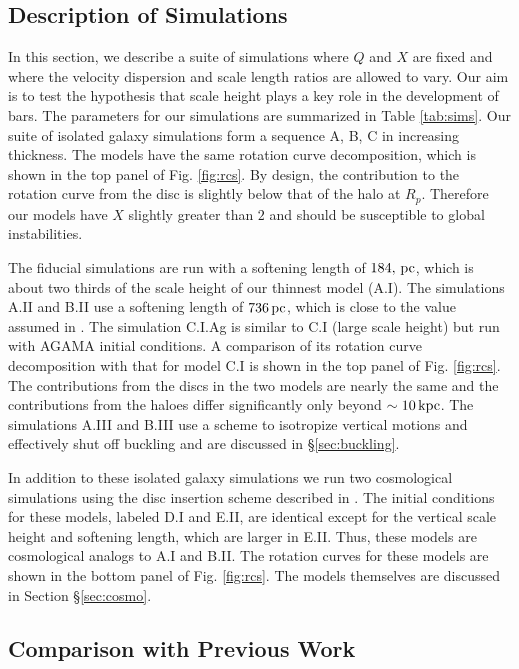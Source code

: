 \subsection{Description of Simulations}

In this section, we describe a suite of simulations where $Q$ and $X$
are fixed and where the velocity dispersion and scale length
ratios are allowed to vary.  Our aim is to test the hypothesis that scale
height plays a key role in the development of bars.  The parameters
for our simulations are summarized in Table \ref{tab:sims}.  Our suite
of isolated galaxy simulations form a sequence A, B, C in increasing
thickness.  The models have the same rotation curve decomposition,
which is shown in the top panel of Fig. \ref{fig:rcs}.  By design, the
contribution to the rotation curve from the disc is slightly below
that of the halo at $R_p$.  Therefore our models have $X$ slightly
greater than $2$ and should be susceptible to global instabilities.

The fiducial simulations are run with a softening length of
$184,\,{\rm pc}$, which is about two thirds of the scale height of our
thinnest model (A.I).  The simulations A.II and B.II use a softening
length of $736\,{\rm pc}$, which is close to the value assumed in
\citet{YurinSpringelStellarDisks}.  The simulation C.I.Ag is similar
to C.I (large scale height) but run with \textsc{AGAMA} initial
conditions.  A comparison of its rotation curve decomposition with
that for model C.I is shown in the top panel of Fig. \ref{fig:rcs}.
The contributions from the discs in the two models are nearly the same
and the contributions from the haloes differ significantly only beyond
$\sim 10\,{\rm kpc}$.  The simulations A.III and B.III use a scheme to
isotropize vertical motions and effectively shut off buckling and are
discussed in \S \ref{sec:buckling}.

In addition to these isolated galaxy simulations we run two
cosmological simulations using the disc insertion scheme described in
\citet{Bauer2018a}.  The initial conditions for these models, labeled
D.I and E.II, are identical except for the vertical scale height and
softening length, which are larger in E.II.  Thus, these models are
cosmological analogs to A.I and B.II.  The rotation curves for these
models are shown in the bottom panel of Fig. \ref{fig:rcs}.  The
models themselves are discussed in Section \S \ref{sec:cosmo}.

\subsection{Comparison with Previous Work}

